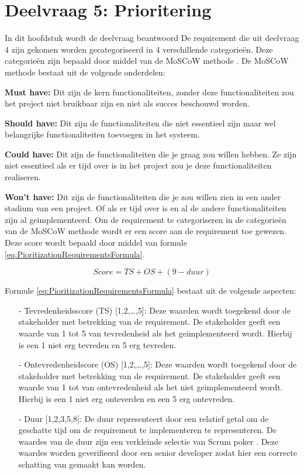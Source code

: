 \section{Deelvraag 5: Prioritering}
\label{sec:Prioritering}
In dit hoofdstuk wordt de deelvraag beantwoord \textit{\SubquestionFive}
De requirement die uit deelvraag 4 zijn gekomen worden gecategoriseerd in 4 verschillende categorieën.
Deze categorieën zijn bepaald door middel van de MoSCoW methode \Parencite{MoSCoW}.
De MoSCoW methode bestaat uit de volgende onderdelen:

\whitespace
\textbf{Must have:} Dit zijn de kern functionaliteiten, zonder deze functionaliteiten zou het project niet bruikbaar zijn en niet als succes beschouwd worden.

\whitespace[1]
\textbf{Should have:} Dit zijn de functionaliteiten die niet essentieel zijn maar wel belangrijke functionaliteiten toevoegen in het systeem.

\whitespace[1]
\textbf{Could have:} Dit zijn de functionaliteiten die je graag zou willen hebben.
Ze zijn niet essentieel als er tijd over is in het project zou je deze functionaliteiten realiseren.

\whitespace[1]
\textbf{Won't have:} Dit zijn de functionaliteiten die je zou willen zien in een ander stadium van een project.
Of als er tijd over is en al de andere functionaliteiten zijn al geimplementeerd.
\whitespace[2]
Om de requirement te categoriseren in de categorieën van de MoSCoW methode wordt er een score aan de requirement toe gewezen.
Deze score wordt bepaald door middel van formule \ref{eq:PioritizationRequirementsFormula}.

\whitespace
\begin{equation}
	\label{eq:PioritizationRequirementsFormula}
	Score = TS + OS + (9 - duur)
\end{equation}

\whitespace
Formule \ref{eq:PioritizationRequirementsFormula} bestaat uit de volgende aspecten:
\begin{enumerate}
	\item[-] Tevredenheidsscore (TS) [1,2,\ldots,5]: Deze waarden wordt toegekend door de stakeholder met betrekking van de requirement.
	      De stakeholder geeft een waarde van 1 tot 5 van tevredenheid als het geimplementeerd wordt.
	      Hierbij is een 1 niet erg tevreden en 5 erg tevreden.
	\item[-] Ontevredenheidscore (OS) [1,2,\dots,5]: Deze waarden wordt toegekend door de stakeholder met betrekking van de requirement.
	      De stakeholder geeft een waarde van 1 tot van ontevredenheid als het niet geimplementeerd wordt.
	      Hierbij is een 1 niet erg onteverden en een 5 erg ontevreden.
	\item[-] Duur [1,2,3,5,8]: De duur representeert door een relatief getal om de geschatte tijd om de requirement te implementeren te representeren.
	      De waardes van de duur zijn een verkleinde selectie van Scrum poker \Parencite{ScrumPoker}.
	      Deze waardes worden geverifieerd door een senior developer zodat hier een correcte schatting van gemaakt kan worden.
\end{enumerate}

